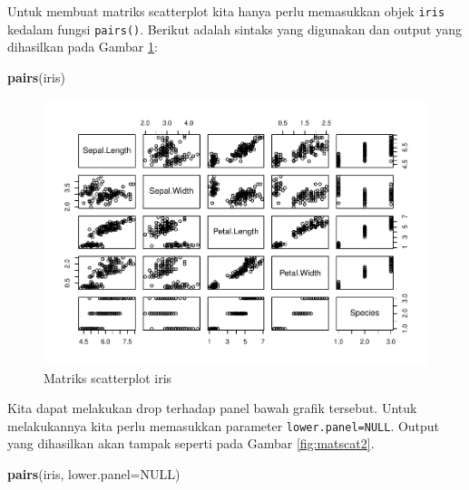 \documentclass[]{book}
\newenvironment{Shaded}{\begin{snugshade}}{\end{snugshade}}
\newcommand{\KeywordTok}[1]{\textcolor[rgb]{0.13,0.29,0.53}{\textbf{#1}}}
\newcommand{\DataTypeTok}[1]{\textcolor[rgb]{0.13,0.29,0.53}{#1}}
\newcommand{\OtherTok}[1]{\textcolor[rgb]{0.56,0.35,0.01}{#1}}
\newcommand{\NormalTok}[1]{#1}
\begin{document}
Untuk membuat matriks scatterplot kita hanya perlu memasukkan objek
\texttt{iris} kedalam fungsi \texttt{pairs()}. Berikut adalah sintaks
yang digunakan dan output yang dihasilkan pada Gambar \ref{fig:matscat}:

\begin{Shaded}
\begin{Highlighting}[]
\KeywordTok{pairs}\NormalTok{(iris)}
\end{Highlighting}
\end{Shaded}

\begin{figure}

{\centering \includegraphics[width=0.8\linewidth]{EnvStat_files/figure-latex/matscat-1} 

}

\caption{Matriks scatterplot iris}\label{fig:matscat}
\end{figure}

Kita dapat melakukan drop terhadap panel bawah grafik tersebut. Untuk
melakukannya kita perlu memasukkan parameter \texttt{lower.panel=NULL}.
Output yang dihasilkan akan tampak seperti pada Gambar
\ref{fig:matscat2}.

\begin{Shaded}
\begin{Highlighting}[]
\KeywordTok{pairs}\NormalTok{(iris, }\DataTypeTok{lower.panel=}\OtherTok{NULL}\NormalTok{)}
\end{Highlighting}
\end{Shaded}
\end{document}
